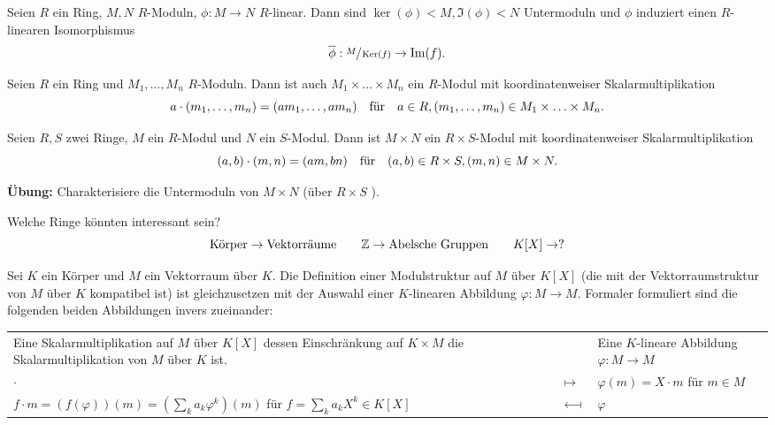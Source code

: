\begin{proposition}
	Seien $R$ ein Ring, $M,N$ $R$-Moduln, $\phi: M \to N$ $R$-linear.
	Dann sind $\ker(\phi) < M, \Im(\phi) < N$ Untermoduln und $\phi$ induziert einen $R$-linearen Isomorphismus
	\[
		\overline{\phi}: \sfrac{M}{\operatorname{Ker}(f)} \to \Im(f)
	.\] 
\end{proposition}

\begin{lemma}
	Seien $R$ ein Ring und $M_1,\ldots,M_{n}$ $R$-Moduln.
	Dann ist auch $M_1 \times \ldots \times M_{n}$ ein $R$-Modul mit koordinatenweiser Skalarmultiplikation
	\[
		a \cdot (m_1,\ldots,m_{n}) = (a m_1,\ldots,a m_{n}) \qq{für} a \in R, (m_1,\ldots,m_{n}) \in M_1 \times \ldots \times M_{n}
	.\] 
\end{lemma}


\begin{lemma}
	Seien $R,S$ zwei Ringe, $M$ ein $R$-Modul und $N$ ein $S$-Modul.
	Dann ist $M \times N$ ein $R \times S$-Modul mit koordinatenweiser Skalarmultiplikation
	\[
		(a,b) \cdot (m,n) = (a m, b n) \qq{für} (a,b) \in R \times S, (m,n) \in M \times N
	.\] 
\end{lemma}


\textbf{Übung:}
Charakterisiere die Untermoduln von $M \times N$ (über $R \times S$ ).

Welche Ringe könnten interessant sein?
\[
	\text{Körper} \to \text{Vektorräume} \qquad \mathbb{Z} \to \text{Abelsche Gruppen} \qquad K[X] \to ?
\] 
\begin{theorem}
	Sei $K$ ein Körper und $M$ ein Vektorraum über $K$.
	Die Definition einer Modulstruktur auf $M$ über $K[X]$ (die mit der Vektorraumstruktur von $M$ über $K$ kompatibel ist)
	ist gleichzusetzen mit der Auswahl einer $K$-linearen Abbildung $\varphi: M \to M$.
	Formaler formuliert sind die folgenden beiden Abbildungen invers zueinander:
	\begin{center}
		\begin{tabu} to \linewidth {X[2] X[0.2] X[2]}
			Eine Skalarmultiplikation auf $M$ über $K[X]$ dessen Einschränkung auf $K \times M$ die Skalarmultiplikation von $M$ über $K$ ist. & & 
			Eine $K$-lineare Abbildung $ \varphi: M \to M$ \\
			\qquad \qquad \qquad \qquad \qquad  $\cdot $ & $\longmapsto $ & $\varphi(m) = X \cdot m$ für $m \in M$ \\
			$f \cdot m = (f(\varphi))(m) = (\sum_{k} a_{k} \varphi^{k}) (m)$ für $f = \sum_{k} a_{k} X^{k} \in K[X]$ & $\longmapsfrom$ & $\varphi$
		\end{tabu}
	\end{center}
\end{theorem}


